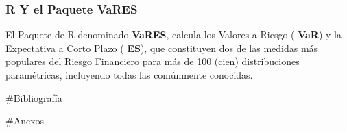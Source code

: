 \documentclass[]{article}
\begin{document}
\hypertarget{r-y-el-paquete-vares}{%
\subsubsection{\texorpdfstring{R Y el Paquete
\textbf{VaRES}}{R Y el Paquete VaRES}}\label{r-y-el-paquete-vares}}

El Paquete de R denominado \textbf{VaRES}, calcula los Valores a Riesgo
( \textbf{VaR}) y la Expectativa a Corto Plazo ( \textbf{ES}), que
constituyen dos de las medidas más populares del Riesgo Financiero para
más de 100 (cien) distribuciones paramétricas, incluyendo todas las
comúnmente conocidas.

\#Bibliografía

\#Anexos
\end{document}
